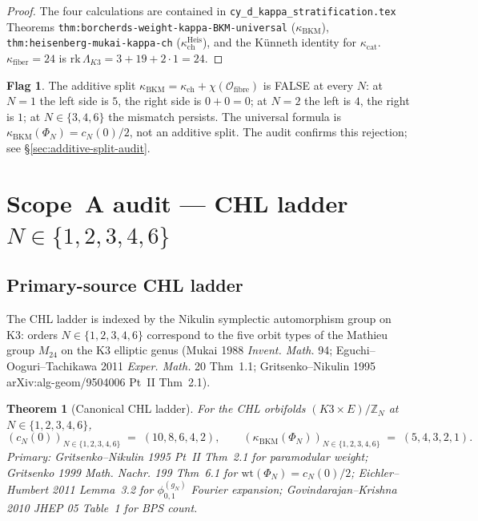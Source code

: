 \documentclass[11pt]{article}
\providecommand{\kBKM}{\kappa_{\mathrm{BKM}}}
\providecommand{\kch}{\kappa_{\mathrm{ch}}}
\providecommand{\kcat}{\kappa_{\mathrm{cat}}}
\providecommand{\kfib}{\kappa_{\mathrm{fiber}}}
\newtheorem{theorem}[lemma]{Theorem}
\theoremstyle{definition}
\newtheorem*{flag}{Flag}
\begin{document}
\begin{proof}
The four calculations are contained in
\texttt{cy\_d\_kappa\_stratification.tex} Theorems
\texttt{thm:borcherds-weight-kappa-BKM-universal} ($\kBKM$),
\texttt{thm:heisenberg-mukai-kappa-ch} ($\kch^{\mathrm{Heis}}$), and
the K\"unneth identity for $\kcat$. $\kfib = 24$ is
$\mathrm{rk}\,\Lambda_{K3} = 3 + 19 + 2 \cdot 1 = 24$.
\end{proof}

\begin{flag}
The additive split $\kBKM = \kch + \chi(\mathcal O_{\mathrm{fibre}})$
is FALSE at every $N$: at $N = 1$ the left side is $5$, the right side
is $0 + 0 = 0$; at $N = 2$ the left is $4$, the right is $1$;
at $N \in \{3, 4, 6\}$ the mismatch persists. The universal
formula is $\kBKM(\Phi_N) = c_N(0)/2$, not an additive split. The
audit confirms this rejection; see \S\ref{sec:additive-split-audit}.
\end{flag}

\section{Scope~A audit --- CHL ladder $N \in \{1, 2, 3, 4, 6\}$}
\label{sec:scope-A}

\subsection{Primary-source CHL ladder}

The CHL ladder is indexed by the Nikulin symplectic automorphism
group on K3: orders $N \in \{1, 2, 3, 4, 6\}$ correspond to the five
orbit types of the Mathieu group $M_{24}$ on the K3 elliptic genus
(Mukai 1988 \emph{Invent. Math.} 94; Eguchi--Ooguri--Tachikawa 2011
\emph{Exper. Math.} 20 Thm~1.1; Gritsenko--Nikulin 1995
arXiv:alg-geom/9504006 Pt~II Thm~2.1).

\begin{theorem}[Canonical CHL ladder]
\label{thm:canonical-chl-ladder}
For the CHL orbifolds $(K3 \times E)/\mathbb Z_N$ at
$N \in \{1, 2, 3, 4, 6\}$,
\[
  (c_N(0))_{N \in \{1,2,3,4,6\}} \;=\; (10, 8, 6, 4, 2),
  \qquad
  (\kBKM(\Phi_N))_{N \in \{1,2,3,4,6\}} \;=\; (5, 4, 3, 2, 1).
\]
Primary: Gritsenko--Nikulin 1995 Pt~II Thm~2.1 for paramodular weight;
Gritsenko 1999 \emph{Math. Nachr.} 199 Thm~6.1 for
$\mathrm{wt}(\Phi_N) = c_N(0)/2$;
Eichler--Humbert 2011 Lemma~3.2 for $\phi^{(g_N)}_{0,1}$ Fourier
expansion; Govindarajan--Krishna 2010 \emph{JHEP} 05 Table~1 for BPS
count.
\end{theorem}
\end{document}
